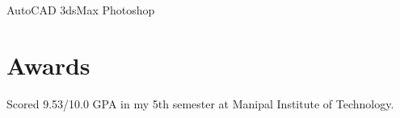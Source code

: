 \documentclass[a4paper]{resume}
\begin{document}
\begin{minipage}[t]{0.33\textwidth}
\vspace{2mm}

AutoCAD \textbullet{} 3dsMax \textbullet{} Photoshop

\sectionspace %


\section{Awards}

Scored 9.53/10.0 GPA in my 5th semester at Manipal Institute of Technology.

\sectionspace %


\end{minipage} %
\hfill
%
%
\end{document}
